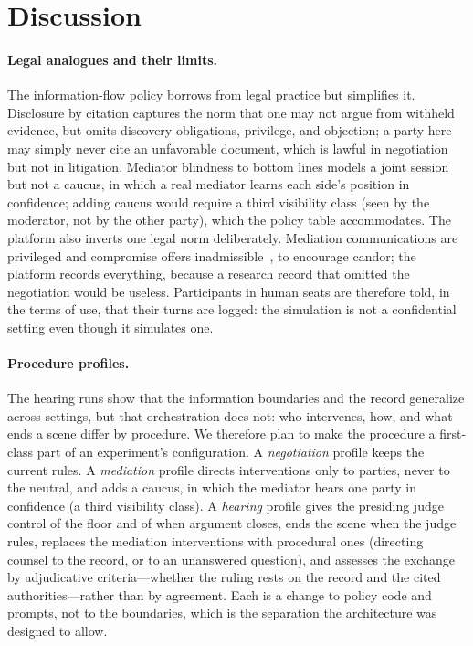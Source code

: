 \documentclass[acmsmall,screen,review]{acmart}
\begin{document}
\section{Discussion}
\label{sec:discussion}

\paragraph{Legal analogues and their limits.}
The information-flow policy borrows from legal practice but simplifies it. Disclosure by citation captures the norm that one may not argue from withheld evidence, but omits discovery obligations, privilege, and objection; a party here may simply never cite an unfavorable document, which is lawful in negotiation but not in litigation. Mediator blindness to bottom lines models a joint session but not a caucus, in which a real mediator learns each side's position in confidence; adding caucus would require a third visibility class (seen by the moderator, not by the other party), which the policy table accommodates. The platform also inverts one legal norm deliberately. Mediation communications are privileged and compromise offers inadmissible~\cite{uma2001,fre408}, to encourage candor; the platform records everything, because a research record that omitted the negotiation would be useless. Participants in human seats are therefore told, in the terms of use, that their turns are logged: the simulation is not a confidential setting even though it simulates one.

\paragraph{Procedure profiles.}
The hearing runs show that the information boundaries and the record generalize across settings, but that orchestration does not: who intervenes, how, and what ends a scene differ by procedure. We therefore plan to make the procedure a first-class part of an experiment's configuration. A \emph{negotiation} profile keeps the current rules. A \emph{mediation} profile directs interventions only to parties, never to the neutral, and adds a caucus, in which the mediator hears one party in confidence (a third visibility class). A \emph{hearing} profile gives the presiding judge control of the floor and of when argument closes, ends the scene when the judge rules, replaces the mediation interventions with procedural ones (directing counsel to the record, or to an unanswered question), and assesses the exchange by adjudicative criteria---whether the ruling rests on the record and the cited authorities---rather than by agreement. Each is a change to policy code and prompts, not to the boundaries, which is the separation the architecture was designed to allow.
\end{document}
